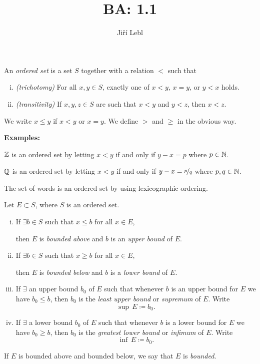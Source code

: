 \documentclass[10pt,aspectratio=149]{beamer}
\author{Ji\v{r}\'i Lebl}
\institute[OSU]{%
Departemento pri Matematiko de Oklahoma {\^S}tata Universitato}
\title{BA: 1.1}
\date{}
\begin{document}
\begin{frame}
\titlepage
\end{frame}

\begin{frame}
\begin{definition}
An \emph{ordered set} is a set $S$ together with
a relation $<$ such that
\pause
\begin{enumerate}[(i)]
\item \emph{(trichotomy)} For all $x, y \in S$, exactly one of
$x < y$, $x=y$, or $y < x$ holds.
\pause
\item \emph{(transitivity)} If $x,y,z \in S$ are such that $x < y$ and $y
< z$, then $x < z$.
\end{enumerate}
\pause
We write $x \leq y$ if $x < y$ or $x=y$.  We define
$>$ and $\geq$ in the obvious way.
\end{definition}
\pause

\textbf{Examples:}

\medskip

${\mathbb{Z}}$ is an ordered set by letting $x < y$ if and only if $y-x = p$ where $p \in {\mathbb{N}}$.

\medskip
\pause

${\mathbb{Q}}$ is an ordered set by letting $x < y$ if and only if $y-x = \nicefrac{p}{q}$ where $p,q \in {\mathbb{N}}$.

\medskip
\pause

The set of words is an ordered set by using lexicographic ordering.

\end{frame}

\begin{frame}

\begin{definition}
Let $E \subset S$, where $S$ is an ordered set.
\pause
\begin{enumerate}[(i)]
\item If $\exists b \in S$ such that $x \leq b$ for all $x \in E$,

then $E$ is \emph{bounded above} and $b$
is an \emph{upper bound} of $E$.
\pause
\item If $\exists b \in S$ such that $x \geq b$ for all $x \in E$,

then $E$ is \emph{bounded below} and $b$
is a \emph{lower bound} of $E$.
\pause
\item If $\exists$ an upper bound $b_0$ of $E$ such that whenever
$b$ is an upper bound for $E$ we have $b_0 \leq b$, then $b_0$
is the \emph{least upper bound} or
\emph{supremum}
of $E$.  Write
\[
\sup\, E \coloneqq b_0  .
\]
\item
\pause
If $\exists$ a lower bound $b_0$ of $E$ such that whenever
$b$ is a lower bound for $E$ we have $b_0 \geq b$, then $b_0$
is the \emph{greatest lower bound} or
\emph{infimum}
of $E$.  Write
\[
\inf\, E \coloneqq b_0  .
\]
\end{enumerate}
\pause
If $E$ is bounded above and bounded below, we say that
$E$ is \emph{bounded}.
\end{definition}
\end{frame}
\end{document}
